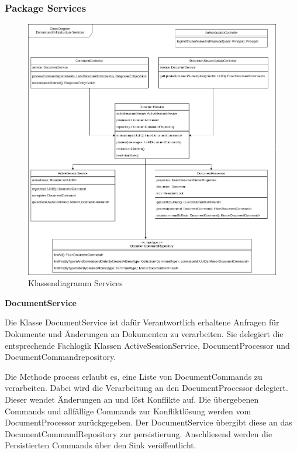 \clearpage

\subsubsection{Package Services}

\begin{figure}[h]
    \centering
    \begin{minipage}[b]{0.8\textwidth}
        \includegraphics[width=\textwidth]{graphics/class-be.drawio}
        \caption{Klassendiagramm Services}
    \end{minipage}
\end{figure}


\textbf{DocumentService}

Die Klasse DocumentService ist dafür Verantwortlich erhaltene Anfragen für Dokumente und Änderungen an Dokumenten zu verarbeiten.
Sie delegiert die entsprechende Fachlogik Klassen ActiveSessionService, DocumentProcessor und DocumentCommandrepository.

Die Methode process erlaubt es, eine Liste von DocumentCommands zu verarbeiten.
Dabei wird die Verarbeitung an den DocumentProcessor delegiert.
Dieser wendet Änderungen an und löst Konflikte auf.
Die übergebenen Commands und allfällige Commands zur Konfliktlösung werden vom DocumentProcessor zurückgegeben.
Der DocumentService übergibt diese an das DocumentCommandRepository zur persistierung.
Anschliesend werden die Persistierten Commands über den Sink veröffentlicht.


